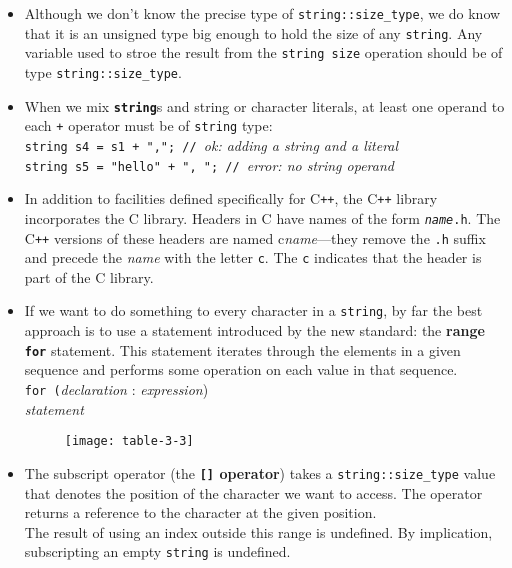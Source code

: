 \begin{itemize}
\item
Although we don't know the precise type of \texttt{string::size\_type}, we do know that it is an unsigned type big enough to hold the size of any \texttt{string}. Any variable used to stroe the result from the \texttt{string size} operation should be of type \texttt{string::size\_type}.

\item
When we mix \textbf{\texttt{string}}s and string or character literals, at least one operand to each \texttt{+} operator must be of \texttt{string} type:\\
\hspace*{1em}\texttt{string s4 = s1 + ","; // }\textit{ok: adding a string and a literal}\\
\hspace*{1em}\texttt{string s5 = "hello" + ", "; // }\textit{error: no string operand}

\item
In addition to facilities defined specifically for C\texttt{++}, the C\texttt{++} library incorporates the C library. Headers in C have names of the form \texttt{\textit{name}.h}. The C\texttt{++} versions of these headers are named c\textit{name}---they remove the \texttt{.h} suffix and precede the \textit{name} with the letter \texttt{c}. The \texttt{c} indicates that the header is part of the C library.

\item
If we want to do something to every character in a \texttt{string}, by far the best approach is to use a statement introduced by the new standard: the \textbf{range \texttt{for}} statement. This statement iterates through the elements in a given sequence and performs some operation on each value in that sequence.\\
\hspace*{1em}\texttt{for (}\textit{declaration }:\textit{ expression})\\
\hspace*{3em}\textit{statement}

\begin{figure}[ht]
\texttt{[image: table-3-3]}
\centering
\end{figure}

\item
The subscript operator (the \textbf{\texttt{[]} operator}) takes a \texttt{string::size\_type} value that denotes the position of the character we want to access. The operator returns a reference to the character at the given position.\\
The result of using an index outside this range is undefined. By implication, subscripting an empty \texttt{string} is undefined.


\end{itemize}
